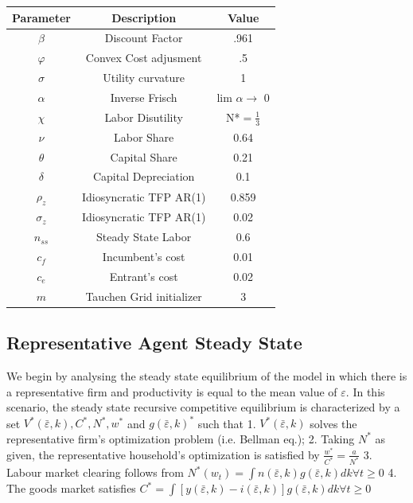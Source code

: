 \documentclass[]{article}
\begin{document}
\begin{center}
 \begin{tabular}{ | c |  c |  c | }
\hline
 Parameter & Description & Value \\ [0.5 ex]
\hline \hline
 $\beta$ & Discount Factor & .961 \\
\hline
$\varphi$ & Convex Cost adjusment & .5 \\
 $\sigma$ & Utility curvature & 1 \\
 $\alpha$ & Inverse Frisch & lim $\alpha \rightarrow$ 0 \\
 $\chi$ & Labor Disutility & N*$=\frac{1}{3}$ \\
 $\nu$ & Labor Share & 0.64 \\
 $\theta$ & Capital Share & 0.21 \\
 $\delta$ & Capital Depreciation  &  0.1  \\
 $\rho_{z}$ & Idiosyncratic TFP AR(1) &  0.859 \\
 $\sigma_{z}$ & Idiosyncratic TFP AR(1) &  0.02 \\
 $n_{ss}$ & Steady State Labor & 0.6 \\
$c_{f}$ & Incumbent's cost & 0.01 \\
$c_{e}$ & Entrant's cost & 0.02 \\
$m$ & Tauchen Grid initializer & 3 \\
\hline
\end{tabular}    
\end{center}


\subsection{Representative Agent Steady State}
We begin by analysing the steady state equilibrium of the model in which there is a representative firm and productivity is equal to the mean value of \( \varepsilon \). In this scenario, the steady state recursive competitive equilibrium is characterized by a set \( V^{*}(\bar{\varepsilon}, k), C^{*}, N^{*}, w^{*} \) and \( g(\bar{\varepsilon}, k)^{*} \) such that
1. \( V^{*}(\bar{\varepsilon}, k) \) solves the representative firm's optimization problem (i.e. Bellman eq.);
2. Taking \( N^{*} \) as given, the representative household's optimization is satisfied by \( \frac{w^{*}}{C^{*}}=\frac{a}{N^{*}} \)
3. Labour market clearing follows from \( N^{*}\left(w_{t}\right)=\int n(\bar{\varepsilon}, k) g(\bar{\varepsilon}, k) d k \forall t \geq 0 \)
4. The goods market satisfies \( C^{*}=\int[y(\bar{\varepsilon}, k)-i(\bar{\varepsilon}, k)] g(\bar{\varepsilon}, k) d k \forall t \geq 0 \)
\end{document}
